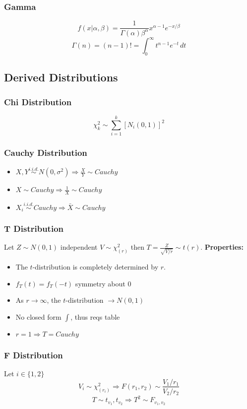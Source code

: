 		\subsubsection*{Gamma}
			\[f(x|\alpha,\beta) = \frac{1}{\Gamma(\alpha)\beta^\alpha}x^{\alpha-1}e^{-x/\beta}\]
			\[\Gamma(n) = (n-1)! = \int_{0}^{\infty}t^{n-1}e^{-t}\,dt\]
		
	\subsection*{Derived Distributions}
		\subsubsection*{Chi Distribution}
			\[ \chi^2_k \sim \sum_{i=1}^{k} \left[N_i(0,1)\right]^2	\]
				
		\subsubsection*{Cauchy Distribution}
			\begin{itemize}
				\item \(X,Y \overset{i.i.d.}{\sim} N(0,\sigma^2) \Rightarrow \frac{X}{Y}\sim Cauchy\)
				\item \(X \sim Cauchy \Rightarrow \frac{1}{X}\sim Cauchy\)
				\item \(X_i \overset{i.i.d.}{\sim} Cauchy \Rightarrow \bar X \sim Cauchy\)
			\end{itemize}
		
		\subsubsection*{T Distribution}
			Let \(Z\sim N(0,1)\) independent \(V\sim\chi_{(r)}^2\) then \(T=\frac{Z}{\sqrt{V/r}}\sim t(r)\).
			\textbf{Properties:}
			\begin{itemize}
				\item The \(t\)-distribution is completely determined by \(r\).
				\item \(f_T(t)=f_T(-t)\) symmetry about \(0\)
				\item As \(r \rightarrow\infty\), the \(t\)-distribution \(\rightarrow N(0,1)\)
				\item No closed form \(\int\), thus reqs table
				\item \(r=1 \Rightarrow T = Cauchy\) 
			\end{itemize}
		
		\subsubsection*{F Distribution}
			Let \(i\in\{1,2\}\)
			\[ V_i\sim \chi^2_{(r_i)} \Rightarrow F(r_1,r_2)\sim\frac{V_1/r_1}{V_2/r_2}\]
			\[ T\sim t_{v_1},t_{v_2} \Rightarrow T^2\sim F_{v_1,v_2} \]
			
